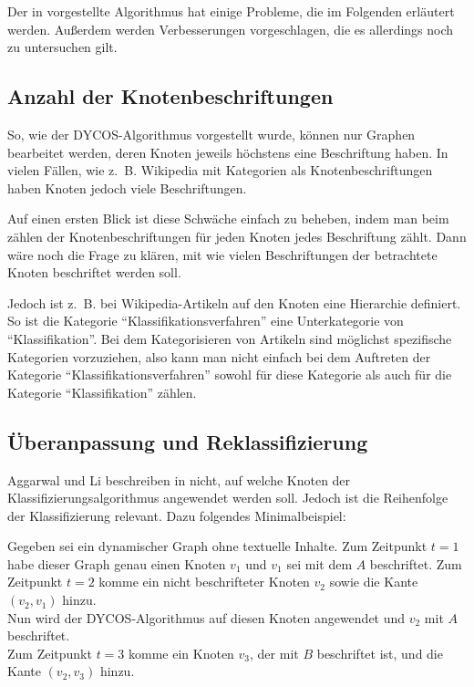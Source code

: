 Der in \cite{aggarwal2011} vorgestellte Algorithmus hat einige Probleme,
die im Folgenden erläutert werden. Außerdem werden Verbesserungen
vorgeschlagen, die es allerdings noch zu untersuchen gilt.

\subsection{Anzahl der Knotenbeschriftungen}
So, wie der DYCOS-Algorithmus vorgestellt wurde, können nur Graphen bearbeitet werden, 
deren Knoten jeweils höchstens eine Beschriftung haben. In vielen Fällen, wie z.~B. 
Wikipedia mit Kategorien als Knotenbeschriftungen haben Knoten jedoch viele Beschriftungen.

Auf einen ersten Blick ist diese Schwäche einfach zu beheben, indem 
man beim zählen der Knotenbeschriftungen für jeden Knoten jedes Beschriftung zählt. Dann
wäre noch die Frage zu klären, mit wie vielen Beschriftungen der betrachtete
Knoten beschriftet werden soll.

Jedoch ist z.~B. bei Wikipedia-Artikeln auf den Knoten eine 
Hierarchie definiert. So ist die Kategorie \enquote{Klassifikationsverfahren}
eine Unterkategorie von \enquote{Klassifikation}. Bei dem Kategorisieren
von Artikeln sind möglichst spezifische Kategorien vorzuziehen, also
kann man nicht einfach bei dem Auftreten der Kategorie \enquote{Klassifikationsverfahren}
sowohl für diese Kategorie als auch für die Kategorie \enquote{Klassifikation}
zählen.


\subsection{Überanpassung und Reklassifizierung}
Aggarwal und Li beschreiben in \cite{aggarwal2011} nicht, auf welche
Knoten der Klassifizierungsalgorithmus angewendet werden soll. Jedoch
ist die Reihenfolge der Klassifizierung relevant. Dazu folgendes 
Minimalbeispiel:

Gegeben sei ein dynamischer Graph ohne textuelle Inhalte. Zum Zeitpunkt
$t=1$ habe dieser Graph genau einen Knoten $v_1$ und $v_1$  sei
mit dem $A$ beschriftet. Zum Zeitpunkt $t=2$ komme ein nicht beschrifteter
Knoten $v_2$ sowie die Kante $(v_2, v_1)$ hinzu.\\
Nun wird der DYCOS-Algorithmus auf diesen Knoten angewendet und
$v_2$ mit $A$ beschriftet.\\
Zum Zeitpunkt $t=3$ komme ein Knoten $v_3$, der mit $B$ beschriftet ist,
und die Kante $(v_2, v_3)$ hinzu.

